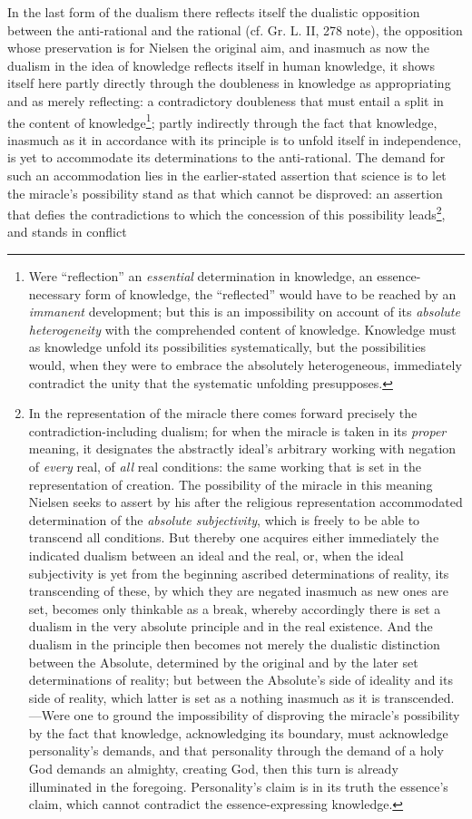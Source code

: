 \documentclass[12pt,a4paper]{book}
\begin{document}
In the last form of the dualism there reflects itself the dualistic opposition between the anti-rational
and the rational (cf. Gr. L. II, 278 note), the opposition whose preservation is for Nielsen the original
aim, and inasmuch as now the dualism in the idea of knowledge reflects itself in human knowledge, it
shows itself here partly directly through the doubleness in knowledge as appropriating and as merely
reflecting: a contradictory doubleness that must entail a split in the content of
knowledge\footnote{Were ``reflection'' an \emph{essential} determination in knowledge, an essence-necessary form
of knowledge, the ``reflected'' would have to be reached by an \emph{immanent} development; but this is an
impossibility on account of its \emph{absolute heterogeneity} with the comprehended content of knowledge.
Knowledge must as knowledge unfold its possibilities systematically, but the possibilities would, when they
were to embrace the absolutely heterogeneous, immediately contradict the unity that the systematic
unfolding presupposes.}; partly indirectly through the fact that knowledge, inasmuch as it in accordance
with its principle is to unfold itself in independence, is yet to accommodate its determinations to the
anti-rational. The demand for such an accommodation lies in the earlier-stated assertion that science is
to let the miracle's possibility stand as that which cannot be disproved: an assertion that defies the
contradictions to which the concession of this possibility leads\footnote{In the representation of the
miracle there comes forward precisely the contradiction-including dualism; for when the miracle is taken in
its \emph{proper} meaning, it designates the abstractly ideal's arbitrary working with negation of \emph{every} real, of
\emph{all} real conditions: the same working that is set in the representation of creation. The possibility of the
miracle in this meaning Nielsen seeks to assert by his after the religious representation accommodated
determination of the \emph{absolute subjectivity}, which is freely to be able to transcend all conditions. But
thereby one acquires either immediately the indicated dualism between an ideal and the real, or, when the
ideal subjectivity is yet from the beginning ascribed determinations of reality, its transcending of these,
by which they are negated inasmuch as new ones are set, becomes only thinkable as a break, whereby
accordingly there is set a dualism in the very absolute principle and in the real existence. And the dualism
in the principle then becomes not merely the dualistic distinction between the Absolute, determined by the
original and by the later set determinations of reality; but between the Absolute's side of ideality and its
side of reality, which latter is set as a nothing inasmuch as it is transcended. ---Were one to ground the
impossibility of disproving the miracle's possibility by the fact that knowledge, acknowledging its boundary,
must acknowledge personality's demands, and that personality through the demand of a holy God demands an
almighty, creating God, then this turn is already illuminated in the foregoing. Personality's claim is in its
truth the essence's claim, which cannot contradict the essence-expressing knowledge.}, and stands in conflict
\end{document}

